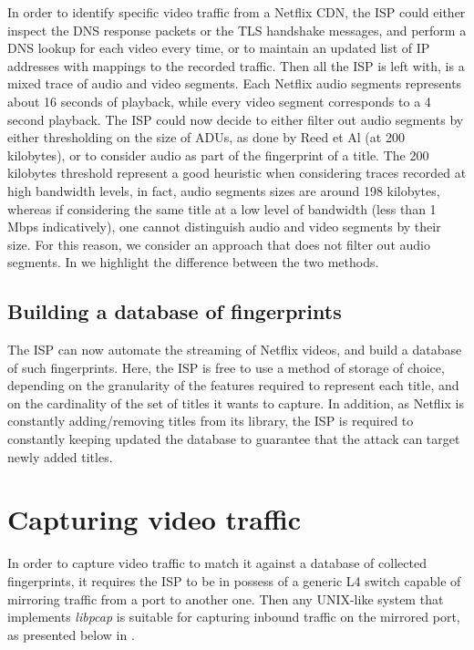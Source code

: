 In order to identify specific video traffic from a Netflix CDN, the ISP could
either inspect the DNS response packets or the TLS handshake messages, and
perform a DNS lookup for each video every time, or to maintain an updated list
of IP addresses with mappings to the recorded traffic. Then all the ISP is left
with, is a mixed trace of audio and video segments. Each Netflix audio segments
represents about 16 seconds of playback, while every video segment corresponds
to a 4 second playback. The ISP could now decide to either filter out audio
segments by either thresholding on the size of ADUs, as done by Reed et Al (at
200 kilobytes), or to consider audio as part of the fingerprint of a title. The
200 kilobytes threshold represent a good heuristic when considering traces
recorded at high bandwidth levels, in fact, audio segments sizes are around 198
kilobytes, whereas if considering the same title at a low level of bandwidth
(less than 1 Mbps indicatively), one cannot distinguish audio and video
segments by their size. For this reason, we consider an approach that does not
filter out audio segments. In  we highlight the difference
between the two methods.

\subsection{Building a database of fingerprints}

The ISP can now automate the streaming of Netflix videos, and build a database
of such fingerprints. Here, the ISP is free to use a method of storage of
choice, depending on the granularity of the features required to represent each
title, and on the cardinality of the set of titles it wants to capture.  In
addition, as Netflix is constantly adding/removing titles from its library, the
ISP is required to constantly keeping updated the database to guarantee that
the attack can target newly added titles.

\newpage

\section{Capturing video traffic}

In order to capture video traffic to match it against a database of collected
fingerprints, it requires the ISP to be in possess of a generic L4 switch
capable of mirroring traffic from a port to another one. Then any UNIX-like
system that implements \emph{libpcap} is suitable for capturing inbound traffic
on the mirrored port, as presented below in .

